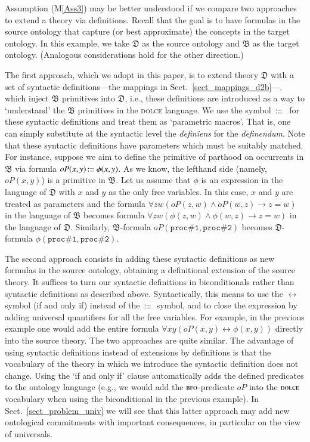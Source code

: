 \documentclass[ao]{iosart2x}
\newcommand{\nb}[1]{\textcolor{red}{$|$}\marginpar{\hspace*{-0cm}\parbox{20mm}{\scriptsize\raggedright\textcolor{red}{#1}}}}
\newcommand{\prbfo}[1]{{\textit{{#1}}}}
\newcommand{\cn}[1]{\mathtt{#1}}
\newcommand{\ifif}{\leftrightarrow}
\newcommand\textequal{%
 \rule[.08ex]{5pt}{0.35pt}\llap{\rule[.78ex]{5pt}{0.35pt}}}
\newcommand{\sdef}{{\hspace{1.5pt}:\hspace{-2.5pt}\textequal\hspace{3pt}}}
\newcommand{\dolce}{{\textsc{dolce}}}
\newcommand{\bfo}{{\textsc{bfo}}}
\newcommand {\thdolce} {\ensuremath{\mathfrak{D}}}
\newcommand {\thbfo} {\ensuremath{\mathfrak{B}}}
\newcommand{\bfoopart}{\prbfo{oP}}
\begin{document}
Assumption (M\ref{Ass3}) may be better understood if we compare two approaches to extend a theory via definitions. 
Recall that the goal is to have formulas in the source ontology that capture (or best approximate) the concepts in the target ontology. In this example, we take {$\thdolce$} as the source ontology and {$\thbfo$} as the target ontology. (Analogous considerations hold for the other direction.)

The first approach, which we adopt in this paper, is to extend theory $\thdolce$ with a set of syntactic definitions---the mappings in Sect.~\ref{sect_mappings_d2b}---, which inject {$\thbfo$} primitives into {$\thdolce$}, i.e., these definitions are introduced as a way to `understand' the {$\thbfo$} primitives in the {\dolce} language. 
We use the symbol {$\sdef$} \,for these syntactic definitions and treat them as `parametric macros'. That is, one can simply substitute at the syntactic level the \emph{definiens} for the \emph{definendum}. Note that these syntactic definitions have parameters which must be suitably matched. For instance, suppose we aim to define the primitive of parthood on occurrents in {$\thbfo$} via formula $\bfoopart(x,y) \sdef \phi(x,y)$. As we know, the lefthand side (namely, $\bfoopart(x,y)$) is a primitive in {$\thbfo$}. Let us assume that $\phi$ is an expression in the language of {$\thdolce$} with $x$ and $y$ as the only free variables. %
In this case, $x$ and $y$ are treated as parameters and the formula $\forall zw(\bfoopart(z,w) \land \bfoopart(w,z) \to z=w)$ in the language of {$\thbfo$} becomes formula $\forall zw(\phi(z,w) \land \phi(w,z) \to z=w)$ in the language of {$\thdolce$}. Similarly, {$\thbfo$}-formula $\bfoopart(\cn{proc\#1},\cn{proc\#2})$ becomes {$\thdolce$}-formula $\phi(\cn{proc\#1},\cn{proc\#2})$. 

The second approach consists in adding these syntactic definitions as new formulas in the source ontology, obtaining a definitional extension of the source theory. %
It suffices to turn our syntactic definitions in biconditionals rather than syntactic definitions as described above. Syntactically, this means to use the $\ifif$ symbol (if and only if) instead of the $\sdef$ symbol, and to close the expression by adding universal quantifiers for all the free variables. For example, in the previous example one would add the entire formula $\forall xy(\bfoopart(x,y) \ifif \phi(x,y))$ directly into the source theory. The two approaches are quite similar. The advantage of using syntactic definitions instead of extensions by definitions is that the vocabulary of the theory in which we introduce the syntactic definition does not change. Using the `if and only if' clause automatically adds the defined predicates to the ontology language (e.g., we would add the {$\bfo$}-predicate $\bfoopart$ into the {$\dolce$} vocabulary when using the biconditional in the previous example). In Sect.~\ref{sect_problem_univ} we will see that this latter approach may add new ontological commitments with important consequences, in particular on the view of universals.
\end{document}
